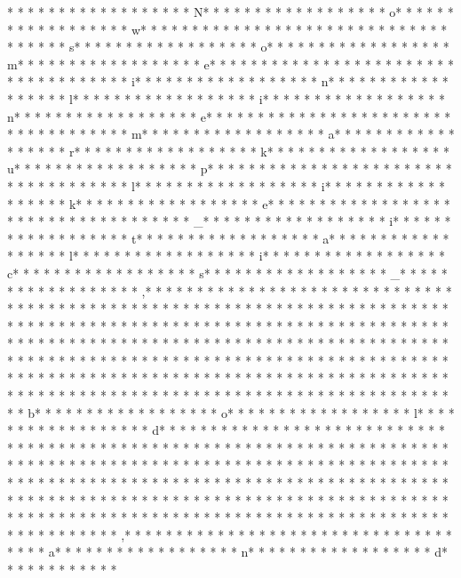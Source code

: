 * * *  * * *  * * *  *  * * *  *  * * *  * N* * *  * * *  * * *  *  * * *  *  * * *  * o* * *  * * *  * * *  *  * * *  *  * * *  * w* * *  * * *  * * *  *  * * *  *  * * *  *  * * *  * * *  * * *  *  * * *  *  * * *  * s* * *  * * *  * * *  *  * * *  *  * * *  * o* * *  * * *  * * *  *  * * *  *  * * *  * m* * *  * * *  * * *  *  * * *  *  * * *  * e* * *  * * *  * * *  *  * * *  *  * * *  *  * * *  * * *  * * *  *  * * *  *  * * *  * i* * *  * * *  * * *  *  * * *  *  * * *  * n* * *  * * *  * * *  *  * * *  *  * * *  * l* * *  * * *  * * *  *  * * *  *  * * *  * i* * *  * * *  * * *  *  * * *  *  * * *  * n* * *  * * *  * * *  *  * * *  *  * * *  * e* * *  * * *  * * *  *  * * *  *  * * *  *  * * *  * * *  * * *  *  * * *  *  * * *  * m* * *  * * *  * * *  *  * * *  *  * * *  * a* * *  * * *  * * *  *  * * *  *  * * *  * r* * *  * * *  * * *  *  * * *  *  * * *  * k* * *  * * *  * * *  *  * * *  *  * * *  * u* * *  * * *  * * *  *  * * *  *  * * *  * p* * *  * * *  * * *  *  * * *  *  * * *  *  * * *  * * *  * * *  *  * * *  *  * * *  * l* * *  * * *  * * *  *  * * *  *  * * *  * i* * *  * * *  * * *  *  * * *  *  * * *  * k* * *  * * *  * * *  *  * * *  *  * * *  * e* * *  * * *  * * *  *  * * *  *  * * *  *  * * *  * * *  * * *  *  * * *  *  * * *  * _* * *  * * *  * * *  *  * * *  *  * * *  * i* * *  * * *  * * *  *  * * *  *  * * *  * t* * *  * * *  * * *  *  * * *  *  * * *  * a* * *  * * *  * * *  *  * * *  *  * * *  * l* * *  * * *  * * *  *  * * *  *  * * *  * i* * *  * * *  * * *  *  * * *  *  * * *  * c* * *  * * *  * * *  *  * * *  *  * * *  * s* * *  * * *  * * *  *  * * *  *  * * *  * _* * *  * * *  * * *  *  * * *  *  * * *  * ,* * *  * * *  * * *  *  * * *  *  * * *  *  * * *  * * *  * * *  *  * * *  *  * * *  *  * * *  * * *  * * *  *  * * *  *  * * *  * * *  * * *  *  * * *  *  * * *  * * *  * * *  *  * * *  *  * * *  *  * * *  * * *  * * *  *  * * *  *  * * *  *  * * *  * * *  * * *  *  * * *  *  * * *  *  * * *  * * *  * * *  *  * * *  *  * * *  *  * * *  * * *  * * *  *  * * *  *  * * *  *  * * *  * * *  * * *  *  * * *  *  * * *  * * *  * * *  *  * * *  *  * * *  * * *  * * *  *  * * *  *  * * *  *  * * *  * * *  * * *  *  * * *  *  * * *  *  * * *  * * *  * * *  *  * * *  *  * * *  *  * * *  * * *  * * *  *  * * *  *  * * *  *  * * *  * * *  * * *  *  * * *  *  * * *  *  * * *  * * *  * * *  *  * * *  *  * * *  * b* * *  * * *  * * *  *  * * *  *  * * *  * o* * *  * * *  * * *  *  * * *  *  * * *  * l* * *  * * *  * * *  *  * * *  *  * * *  * d* * *  * * *  * * *  *  * * *  *  * * *  * * *  * * *  *  * * *  *  * * *  * * *  * * *  *  * * *  *  * * *  *  * * *  * * *  * * *  *  * * *  *  * * *  *  * * *  * * *  * * *  *  * * *  *  * * *  *  * * *  * * *  * * *  *  * * *  *  * * *  *  * * *  * * *  * * *  *  * * *  *  * * *  *  * * *  * * *  * * *  *  * * *  *  * * *  * * *  * * *  *  * * *  *  * * *  * * *  * * *  *  * * *  *  * * *  *  * * *  * * *  * * *  *  * * *  *  * * *  *  * * *  * * *  * * *  *  * * *  *  * * *  *  * * *  * * *  * * *  *  * * *  *  * * *  *  * * *  * * *  * * *  *  * * *  *  * * *  *  * * *  * * *  * * *  *  * * *  *  * * *  * ,* * *  * * *  * * *  *  * * *  *  * * *  *  * * *  * * *  * * *  *  * * *  *  * * *  * a* * *  * * *  * * *  *  * * *  *  * * *  * n* * *  * * *  * * *  *  * * *  *  * * *  * d* * *  * * *  * * *  *  * * 